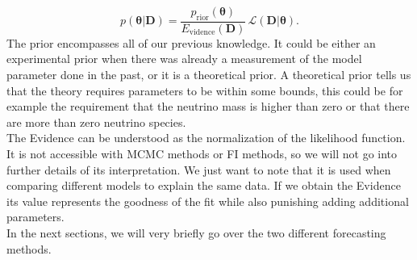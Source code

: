 \documentclass[../main.tex]{subfiles}
\begin{document}
\begin{equation}
    p(\boldsymbol{\theta}|\boldsymbol{D}) = \frac{p_\mathrm{rior}(\boldsymbol{\theta})}{E_\mathrm{vidence}(\boldsymbol{D})}\,\mathcal{L}(\boldsymbol{D}|\boldsymbol{\theta}).
\end{equation}
The prior encompasses all of our previous knowledge. It could be either an experimental prior when there was already a measurement of the model parameter done in the past, or it is a theoretical prior. A theoretical prior tells us that the theory requires parameters to be within some bounds, this could be for example the requirement that the neutrino mass is higher than zero or that there are more than zero neutrino species.\\
The Evidence can be understood as the normalization of the likelihood function. It is not accessible with MCMC methods or FI methods, so we will not go into further details of its interpretation. We just want to note that it is used when comparing different models to explain the same data. If we obtain the Evidence its value represents the goodness of the fit while also punishing adding additional parameters.\\
In the next sections, we will very briefly go over the two different forecasting methods.  
\end{document}
